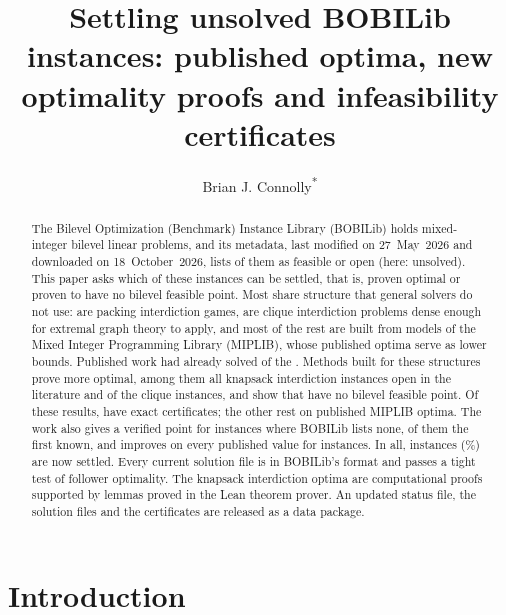 \documentclass[]{spie}  %
\title{Settling \NumSettled{} unsolved BOBILib instances: \NumLitOptimal{} published optima,
\NumNewOptimal{} new optimality proofs and \NumNoFeasible{} infeasibility certificates}
\author{Brian J. Connolly\textsuperscript{*}}
\affil{Beehive Industries}
\theoremstyle{plain}
\begin{document}
\maketitle

\begin{abstract}
The Bilevel Optimization (Benchmark) Instance Library (BOBILib) holds \NumInstances{}
mixed-integer bilevel linear problems, and its metadata, last modified on 27~May~2026 and
downloaded on 18~October~2026, lists \NumUnsolved{} of them as feasible or open (here: unsolved). This paper asks which of these instances can be settled, that is, proven optimal or proven
to have no bilevel feasible point. Most share structure that general solvers do not use:
\NumPacking{} are packing interdiction games, \NumCliqueUnsolved{} are clique interdiction problems
dense enough for extremal graph theory to apply, and most of the rest are built from models of the
Mixed Integer Programming Library (MIPLIB), whose published optima serve as lower bounds. Published
work had already solved \NumLitOptimal{} of the \NumUnsolved{}. Methods built for these structures
prove \NumNewOptimal{} more optimal, among them all \NumNewKip{} knapsack interdiction instances
open in the literature and \NumNewClique{} of the \NumCliqueSet{} clique instances, and show that
\NumNoFeasible{} have no bilevel feasible point. Of these \NumSettledHere{} results,
\NumClassExactSettled{} have exact certificates; the other \NumClassNumericalNew{} rest on published
MIPLIB optima. The work also gives a verified point for \NumFirstPoint{} instances where BOBILib
lists none, \NumFirstAnywhere{} of them the first known, and improves on every published value for
\NumOrBetter{} instances. In all, \NumSettled{} instances (\PctSettled\%) are now settled. Every
current solution file is in BOBILib's format and passes a tight test of follower optimality. The knapsack
interdiction optima are computational proofs supported by lemmas proved in the Lean theorem prover.
An updated status file, the solution files and the certificates are released as a data package.
\end{abstract}


\section{Introduction}\label{sec:intro}
\end{document}
